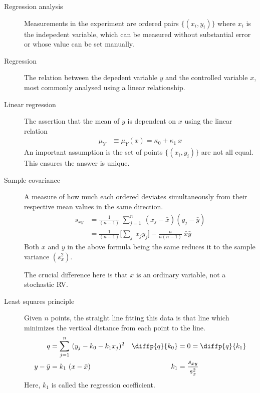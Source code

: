 \begin{description}
    \item[Regression analysis] Measurements in the experiment are ordered pairs
          $ \{(x_i, y_i)\} $ where $ x_i $ is the indepedent variable, which can be
          measured without substantial error or whose value can be set manually.

    \item[Regression] The relation between the depedent variable $ y $ and the
          controlled variable $ x $, most commonly analysed using a linear relationship.

    \item[Linear regression] The assertion that the mean of $ y $ is dependent on $ x $
          using the linear relation
          \begin{align}
              \mu_Y & \equiv \mu_Y(x) = \kappa_0 + \kappa_1\ x
          \end{align}
          An important assumption is the set of points $ \{(x_i, y_i)\} $ are not all
          equal. This ensures the answer is unique.

    \item[Sample covariance] A measure of how much each ordered deviates simultaneously
          from their respective mean values in the same direction.
          \begin{align}
              s_{xy} & = \frac{1}{(n-1)}\ \sum_{j=1}^{n}\ (x_j - \bar{x})
              (y_j - \bar{y})                                             \\
                     & = \frac{1}{(n-1)} \Bigg[\sum_j\ x_j y_j\Bigg] -
              \frac{n}{n(n-1)}\ \bar{x}\bar{y}
          \end{align}
          Both $ x $ and $ y $ in the above formula being the same reduces it to
          the sample variance $ (s_x^2) $. \par
          The crucial difference here is that $ x $ is an ordinary variable, not a
          stochastic RV.

    \item[Least squares principle] Given $ n $ points, the straight line fitting this
          data is that line which minimizes the vertical distance from each point to
          the line.
          \begin{align}
              q               & = \sum_{j=1}^{n}\ (y_j - k_0 - k_1x_j)^2 &
              \diffp {q}{k_0} & = 0 = \diffp{q}{k_1}                       \\
              y - \bar{y}     & = k_1\ (x - \bar{x})                     &
              k_1             & = \frac{s_{xy}}{s^2_x}
          \end{align}
          Here, $ k_1 $ is called the regression coefficient.


\end{description}

